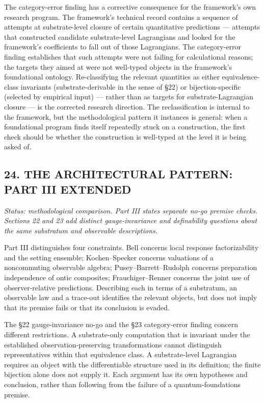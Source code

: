 \documentclass[
]{article}
\begin{document}
The category-error finding has a corrective consequence for the
framework's own research program. The framework's technical record
contains a sequence of attempts at substrate-level closure of certain
quantitative predictions --- attempts that constructed candidate
substrate-level Lagrangians and looked for the framework's coefficients
to fall out of those Lagrangians. The category-error finding establishes
that such attempts were not failing for calculational reasons; the
targets they aimed at were not well-typed objects in the framework's
foundational ontology. Re-classifying the relevant quantities as either
equivalence-class invariants (substrate-derivable in the sense of §22)
or bijection-specific (selected by empirical input) --- rather than as
targets for substrate-Lagrangian closure --- is the corrected research
direction. The reclassification is internal to the framework, but the
methodological pattern it instances is general: when a foundational
program finds itself repeatedly stuck on a construction, the first check
should be whether the construction is well-typed at the level it is
being asked of.

\hypertarget{the-architectural-pattern-part-iii-extended}{%
\subsection{24. THE ARCHITECTURAL PATTERN: PART III
EXTENDED}\label{the-architectural-pattern-part-iii-extended}}

\emph{Status: methodological comparison. Part III states separate no-go
premise checks. Sections 22 and 23 add distinct gauge-invariance and
definability questions about the same substratum and observable
descriptions.}

Part III distinguishes four constraints. Bell concerns local response
factorizability and the setting ensemble; Kochen--Specker concerns
valuations of a noncommuting observable algebra; Pusey--Barrett--Rudolph
concerns preparation independence of ontic composites;
Frauchiger--Renner concerns the joint use of observer-relative
predictions. Describing each in terms of a substratum, an observable law
and a trace-out identifies the relevant objects, but does not imply that
its premise fails or that its conclusion is evaded.

The §22 gauge-invariance no-go and the §23 category-error finding
concern different restrictions. A substrate-only computation that is
invariant under the established observation-preserving transformations
cannot distinguish representatives within that equivalence class. A
substrate-level Lagrangian requires an object with the differentiable
structure used in its definition; the finite bijection alone does not
supply it. Each argument has its own hypotheses and conclusion, rather
than following from the failure of a quantum-foundations premise.
\end{document}

